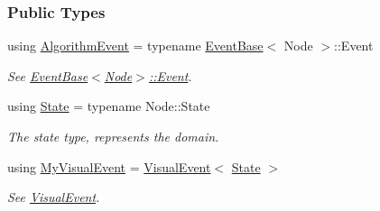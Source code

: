 \subsubsection*{Public Types}
\begin{DoxyCompactItemize}
\item 
using \hyperlink{structslb_1_1core_1_1ui_1_1VisualLog_a699a50e2c261b3dec6cd2fa6bfd4b295}{Algorithm\+Event} = typename \hyperlink{structslb_1_1core_1_1ui_1_1EventBase}{Event\+Base}$<$ Node $>$\+::Event\hypertarget{structslb_1_1core_1_1ui_1_1VisualLog_a699a50e2c261b3dec6cd2fa6bfd4b295}{}\label{structslb_1_1core_1_1ui_1_1VisualLog_a699a50e2c261b3dec6cd2fa6bfd4b295}

\begin{DoxyCompactList}\small\item\em See \hyperlink{structslb_1_1core_1_1ui_1_1EventBase_a7b61ed0ba0f2fdeb854c631188725d37}{Event\+Base$<$\+Node$>$\+::\+Event}. \end{DoxyCompactList}\item 
using \hyperlink{structslb_1_1core_1_1ui_1_1VisualLog_a01b53655973c74791cd073f9f8c25ec6}{State} = typename Node\+::\+State\hypertarget{structslb_1_1core_1_1ui_1_1VisualLog_a01b53655973c74791cd073f9f8c25ec6}{}\label{structslb_1_1core_1_1ui_1_1VisualLog_a01b53655973c74791cd073f9f8c25ec6}

\begin{DoxyCompactList}\small\item\em The state type, represents the domain. \end{DoxyCompactList}\item 
using \hyperlink{structslb_1_1core_1_1ui_1_1VisualLog_a6c09f9d1c9f6159c6a151a2795b5295e}{My\+Visual\+Event} = \hyperlink{structslb_1_1core_1_1ui_1_1VisualEvent}{Visual\+Event}$<$ \hyperlink{structslb_1_1core_1_1ui_1_1VisualLog_a01b53655973c74791cd073f9f8c25ec6}{State} $>$\hypertarget{structslb_1_1core_1_1ui_1_1VisualLog_a6c09f9d1c9f6159c6a151a2795b5295e}{}\label{structslb_1_1core_1_1ui_1_1VisualLog_a6c09f9d1c9f6159c6a151a2795b5295e}

\begin{DoxyCompactList}\small\item\em See \hyperlink{structslb_1_1core_1_1ui_1_1VisualEvent}{Visual\+Event}. \end{DoxyCompactList}\end{DoxyCompactItemize}

